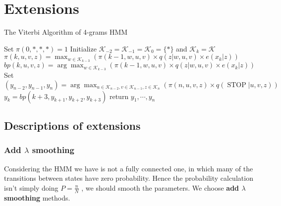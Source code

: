 \section{\textbf{Extensions}}


\begin{algorithm*}[ht]
  \caption{The Viterbi Algorithm of 4-grams HMM}
  \label{algo:4gram}
  Set $\pi(0, *, *, *)=1$\;
  Initialize $\mathcal{K}_{-2} = \mathcal{K}_{-1} = \mathcal{K}_0 = \{*\}$ and $\mathcal{K}_{k} = \mathcal{K}$\;
  {
    {
        $\pi(k, u, v, z)=\max _{w \in \mathcal{K}_{k-3}}\left(\pi(k-1, w, u, v) \times q(z | w, u, v) \times e\left(x_{k} | z\right)\right)$\;
        $bp(k, u, v, z)=\arg \max _{w \in \mathcal{K}_{k-3}}\left(\pi(k-1, w, u, v) \times q(z | w, u, v) \times e\left(x_{k} | z\right)\right)$\;
    }
  }
  Set $\left(y_{n-2}, y_{n-1}, y_{n}\right)=\arg \max _{u \in \mathcal{K}_{n-2}, v \in \mathcal{K}_{n-1}, z \in \mathcal{K}_{n}}(\pi(n, u, v, z) \times q(\operatorname{STOP} | u, v, z))$\;
  {
        $y_{k}=bp\left(k+3, y_{k+1}, y_{k+2}, y_{k+3}\right)$\;
  }
  return $y_1, \cdots, y_n$\;
\end{algorithm*}

\subsection{\textbf{Descriptions of extensions}}

\subsubsection{\textbf{Add $\lambda$ smoothing}}

Considering the HMM we have is not a fully connected one, in which many of the transitions between states have zero probability. Hence the probability calculation isn't simply doing $P=\frac{n}{N}$ , we should smooth the parameters. We choose \textbf{add $\lambda$ smoothing} methods.

